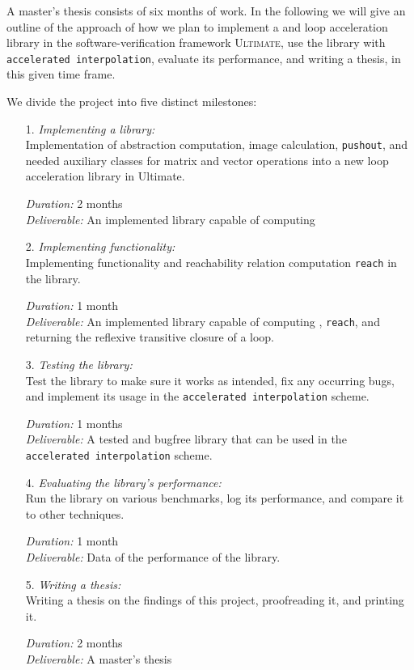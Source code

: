 A master's thesis consists of six months of work. In the following we will give an outline of the approach of how we plan to implement a \qvasr and \qvasrs loop acceleration library in the software-verification framework \textsc{Ultimate}, use the library with \texttt{accelerated interpolation}, evaluate its performance, and writing a thesis, in this given time frame. \\ \par
We divide the project into five distinct milestones:

\begin{itemize}
	\item[1.] \textsl{Implementing a \qvasr library:} \\
               Implementation of \qvasr abstraction computation, \qvasr image calculation, \texttt{pushout}, and needed auxiliary classes for matrix and vector operations into a new loop acceleration library in Ultimate.

			  \textsl{Duration:} 2 months \\
			  \textsl{Deliverable:} An implemented library capable of computing \qvasr

	\item[2.] \textsl{Implementing \qvasrs functionality:} \\
               Implementing \qvasrs functionality and reachability relation computation \texttt{reach} in the \qvasr library.

			  \textsl{Duration:} 1 month \\
			  \textsl{Deliverable:} An implemented library capable of computing \qvasrs, \texttt{reach}, and returning the reflexive transitive closure of a loop.

	\item[3.] \textsl{Testing the library:} \\
               Test the library to make sure it works as intended, fix any occurring bugs, and implement its usage in the \texttt{accelerated interpolation} scheme.

			  \textsl{Duration:} 1 months \\
			  \textsl{Deliverable:} A tested and bugfree \qvasr library that can be used in the \\ \texttt{accelerated interpolation} scheme.

	\item[4.] \textsl{Evaluating the library's performance:} \\
               Run the library on various benchmarks, log its performance, and compare it to other techniques.

			  \textsl{Duration:} 1 month \\
			  \textsl{Deliverable:} Data of the performance of the \qvasr library.

	\item[5.] \textsl{Writing a thesis:} \\
              Writing a thesis on the findings of this project, proofreading it, and printing it.

			  \textsl{Duration:} 2 months \\
			  \textsl{Deliverable:}	A master's thesis
\end{itemize}
